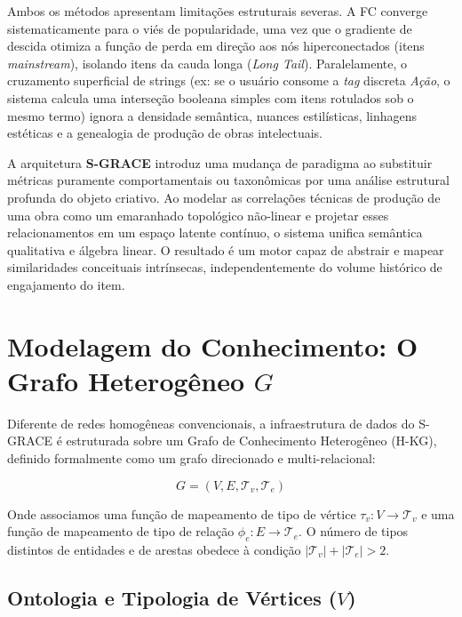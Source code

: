 \documentclass[11pt,a4paper]{article}
\begin{document}
Ambos os métodos apresentam limitações estruturais severas. A FC converge sistematicamente para o
viés de popularidade, uma vez que o gradiente de descida otimiza a função de perda em direção aos
nós hiperconectados (itens \textit{mainstream}), isolando itens da cauda longa (\textit{Long
Tail}). Paralelamente, o cruzamento superficial de strings (ex: se o usuário consome a \textit{tag}
discreta \textit{Ação}, o sistema calcula uma interseção booleana simples com itens rotulados sob
o mesmo termo) ignora a densidade semântica, nuances estilísticas, linhagens estéticas e a
genealogia de produção de obras intelectuais.

A arquitetura \textbf{S-GRACE} introduz uma mudança de paradigma ao substituir métricas puramente
comportamentais ou taxonômicas por uma análise estrutural profunda do objeto criativo. Ao modelar
as correlações técnicas de produção de uma obra como um emaranhado topológico não-linear e projetar
esses relacionamentos em um espaço latente contínuo, o sistema unifica semântica qualitativa e
álgebra linear. O resultado é um motor capaz de abstrair e mapear similaridades conceituais
intrínsecas, independentemente do volume histórico de engajamento do item.


\section{Modelagem do Conhecimento: O Grafo Heterogêneo \texorpdfstring{$G$}{G}}

Diferente de redes homogêneas convencionais, a infraestrutura de dados do S-GRACE é estruturada
sobre um Grafo de Conhecimento Heterogêneo (H-KG), definido formalmente como um grafo direcionado
e multi-relacional:

\begin{equation}
G = (V, E, \mathcal{T}_v, \mathcal{T}_e)
\end{equation}

Onde associamos uma função de mapeamento de tipo de vértice $\tau_v: V \to \mathcal{T}_v$ e uma
função de mapeamento de tipo de relação $\phi_e: E \to \mathcal{T}_e$. O número de tipos distintos
de entidades e de arestas obedece à condição $|\mathcal{T}_v| + |\mathcal{T}_e| > 2$.

\subsection{Ontologia e Tipologia de Vértices \texorpdfstring{($V$)}{(V)}}
\end{document}
